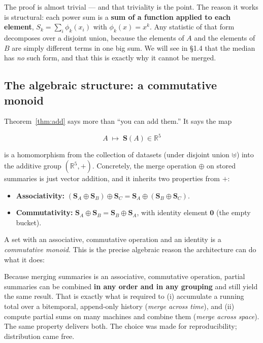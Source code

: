 \documentclass[11pt]{article}
\theoremstyle{definition}
\newcommand{\R}{\mathbb{R}}
\newcommand{\powsum}{\mathbf{S}}
\begin{document}
The proof is almost trivial --- and that triviality is the point. The reason it works is structural:
each power sum is a \textbf{sum of a function applied to each element}, $S_k = \sum_i \phi_k(x_i)$
with $\phi_k(x) = x^k$. Any statistic of that form decomposes over a disjoint union, because the
elements of $A$ and the elements of $B$ are simply different terms in one big sum. We will see in
\S1.4 that the median has \emph{no} such form, and that this is exactly why it cannot be merged.

\subsection{The algebraic structure: a commutative monoid}

Theorem~\ref{thm:add} says more than ``you can add them.'' It says the map

\begin{equation}
  A \;\longmapsto\; \powsum(A) \in \R^5
\end{equation}

is a homomorphism from the collection of datasets (under disjoint union $\uplus$) into the additive
group $(\R^5, +)$. Concretely, the merge operation $\oplus$ on stored summaries is just vector
addition, and it inherits two properties from $+$:

\begin{itemize}[leftmargin=1.4em, itemsep=0.2em]
  \item \textbf{Associativity:} $(\powsum_A \oplus \powsum_B) \oplus \powsum_C
        = \powsum_A \oplus (\powsum_B \oplus \powsum_C)$.
  \item \textbf{Commutativity:} $\powsum_A \oplus \powsum_B = \powsum_B \oplus \powsum_A$,
        with identity element $\mathbf{0}$ (the empty bucket).
\end{itemize}

A set with an associative, commutative operation and an identity is a \emph{commutative monoid}.
This is the precise algebraic reason the architecture can do what it does:

\begin{tcolorbox}[keybox, title={Why the algebra matters}]
Because merging summaries is an associative, commutative operation, partial summaries can be
combined \textbf{in any order and in any grouping} and still yield the same result. That is exactly
what is required to (i) accumulate a running total over a bitemporal, append-only history
(\emph{merge across time}), and (ii) compute partial sums on many machines and combine them
(\emph{merge across space}). The same property delivers both. The choice was made for
reproducibility; distribution came free.
\end{tcolorbox}
\end{document}
